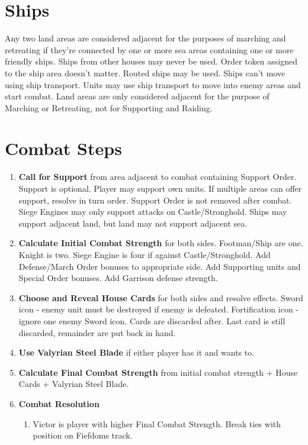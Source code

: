 \documentclass[10pt]{article}
\newenvironment{enumerateCustom}
{\begin{enumerate}
  \setlength{\itemsep}{1pt}
  \setlength{\parskip}{0pt}
  \setlength{\parsep}{0pt}}
{\end{enumerate}}
\begin{document}
\begin{multicols*}{2}
\section*{Ships}
Any two land areas are considered adjacent for the purposes of marching and retreating if they're connected by one or more sea areas containing one or more friendly ships. Ships from other houses may never be used. Order token assigned to the ship area doesn't matter. Routed ships may be used. Ships can't move using ship transport. Units may use ship transport to move into enemy areas and start combat. Land areas are only considered adjacent for the purpose of Marching or Retreating, not for Supporting and Raiding.

\section*{Combat Steps}
\begin{enumerateCustom}
	\item \textbf{Call for Support} from area adjacent to combat containing Support Order. Support is optional. Player may support own units. If multiple areas can offer support, resolve in turn order. Support Order is not removed after combat. Siege Engines may only support attacks on Castle/Stronghold. Ships may support adjacent land, but land may not support adjacent sea.
	\item \textbf{Calculate Initial Combat Strength} for both sides. Footman/Ship are one. Knight is two. Siege Engine is four if against Castle/Stronghold. Add Defense/March Order bonuses to appropriate side. Add Supporting units and Special Order bonuses. Add Garrison defense strength.
	\item \textbf{Choose and Reveal House Cards} for both sides and resolve effects. Sword icon - enemy unit must be destroyed if enemy is defeated. Fortification icon - ignore one enemy Sword icon. Cards are discarded after. Last card is still discarded, remainder are put back in hand.
	\item \textbf{Use Valyrian Steel Blade} if either player has it and wants to.
	\item \textbf{Calculate Final Combat Strength} from initial combat strength + House Cards + Valyrian Steel Blade.
	\item \textbf{Combat Resolution}
	\begin{enumerateCustom}
		\item Victor is player with higher Final Combat Strength. Break ties with position on Fiefdoms track.

\end{enumerateCustom}
\end{enumerateCustom}
\end{multicols*}
\end{document}
